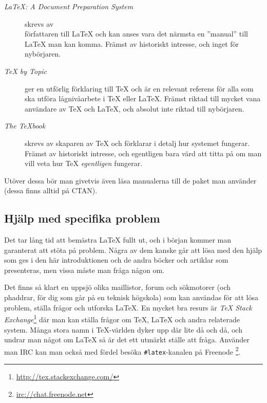 \documentclass[10pt,../../a4.tex]{subfiles}
\begin{document}
\begin{description}
	\item[\emph{\LaTeX: A Document Preparation System} \parencite{Lamport94}]
	skrevs av\\ författaren till \LaTeX{} och kan anses vara det närmsta en
	”manual” till \LaTeX{} man kan komma. Främst av historiskt intresse,
	och inget för nybörjaren.
	
	\item[\emph{\TeX{} by Topic} \parencite{Eijkhout92}]
	ger en utförlig förklaring till \TeX{} och är en relevant referens för
	alla som ska utföra lågnivåarbete i \TeX{} eller \LaTeX{}. Främst
	riktad till mycket vana användare av \TeX{} och \LaTeX{}, och absolut
	inte riktad till nybörjaren.
	
	\item[\emph{The \TeX{}book} \parencite{Knuth86}]
	skrevs av skaparen av \TeX{} och förklarar i detalj hur systemet
	fungerar. Främst av historiskt intresse, och egentligen bara värd att
	titta på om man vill veta hur \TeX{} \emph{egentligen} fungerar.
\end{description}

Utöver dessa bör man givetvis även läsa manualerna till de paket man
använder (dessa finns alltid på CTAN).

\subsection{Hjälp med specifika problem}
Det tar lång tid att bemästra \LaTeX{} fullt ut, och i början kommer man
garanterat att stöta på problem. Några av dem kanske går att lösa med den
hjälp som ges i den här introduktionen och de andra böcker och artiklar
som presenteras, men vissa måste man fråga någon om.

Det finns så klart en uppsjö olika maillistor, forum och sökmotorer (och
phaddrar, för dig som går på en teknisk högskola) som kan användas för att
lösa problem, ställa frågor och utforska \LaTeX. En mycket bra resurs är
\emph{\TeX{} Stack Exchange}\footnote{\url{http://tex.stackexchange.com/}}
där man kan ställa frågor om \TeX, \LaTeX{} och andra relaterade system.
Många stora namn i \TeX-världen dyker upp där lite då och då, och undrar
man något om \LaTeX{} så är det ett utmärkt ställe att fråga. Använder man
IRC kan man också med fördel besöka \verb|#latex|-kanalen på Freenode%
\footnote{\url{irc://chat.freenode.net}}.

\end{document}
